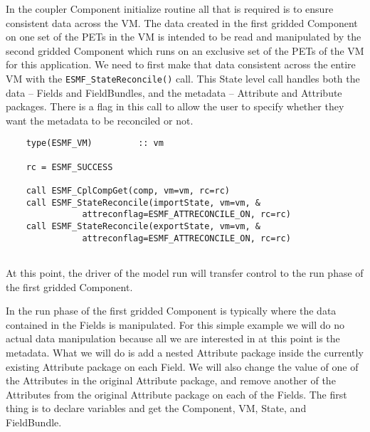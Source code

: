    In the coupler Component initialize routine all that is required
   is to ensure consistent data across the VM.  The data created
   in the first gridded Component on one set of the PETs in the VM is
   intended to be read and manipulated by the second gridded Component
   which runs on an exclusive set of the PETs of the VM for this
   application.  We need to first make that data consistent across the
   entire VM with the {\tt ESMF\_StateReconcile()} call.
   This State level call handles both the data -- Fields and FieldBundles,
   and the metadata -- Attribute and Attribute packages.  There is a flag in
   this call to allow the user to specify whether they want
   the metadata to be reconciled or not. 

 \begin{verbatim}
    type(ESMF_VM)         :: vm

    rc = ESMF_SUCCESS

    call ESMF_CplCompGet(comp, vm=vm, rc=rc)
    call ESMF_StateReconcile(importState, vm=vm, &
               attreconflag=ESMF_ATTRECONCILE_ON, rc=rc)
    call ESMF_StateReconcile(exportState, vm=vm, &
               attreconflag=ESMF_ATTRECONCILE_ON, rc=rc)
 
\end{verbatim}
 

   At this point, the driver of the model run will transfer control to the
   run phase of the first gridded Component. 

   In the run phase of the first gridded Component is typically where the
   data contained in the Fields is manipulated.  For this simple example
   we will do no actual data manipulation because all we are interested in
   at this point is the metadata.  What we will do is add a nested Attribute
   package inside the currently existing Attribute package on each Field.  We
   will also change the value of one of the Attributes in the original Attribute
   package, and remove another of the Attributes from the original Attribute
   package on each of the Fields.  The first thing is to declare variables and
   get the Component, VM, State, and FieldBundle. 

